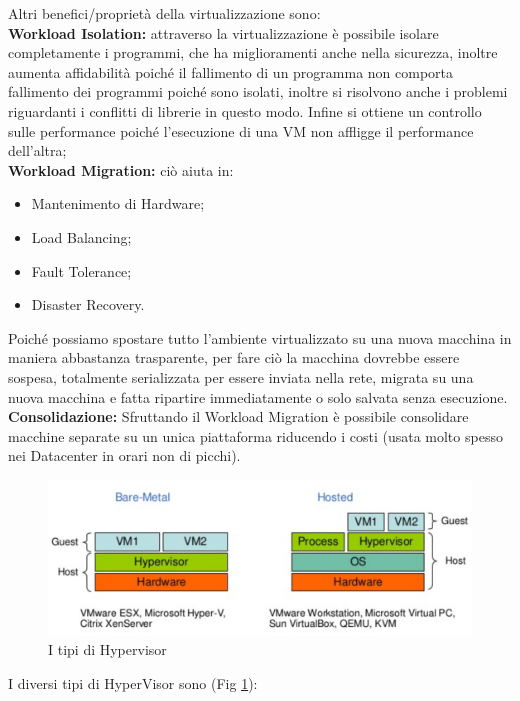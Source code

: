 \documentclass[11pt, twocolumn]{article}
\newenvironment{myitemize}
{ \begin{itemize}
		\setlength{\itemsep}{0pt}
		\setlength{\parskip}{0pt}
		\setlength{\parsep}{0pt}     }
	{ \end{itemize}                  }
\begin{document}
Altri benefici/proprietà della virtualizzazione sono:\\
\textbf{Workload Isolation:} attraverso la virtualizzazione è possibile isolare completamente i programmi, che ha miglioramenti anche nella sicurezza, inoltre aumenta affidabilità poiché il fallimento di un programma non comporta fallimento dei programmi poiché sono isolati, inoltre si risolvono anche i problemi riguardanti i conflitti di librerie in questo modo. Infine si ottiene un controllo sulle performance poiché l'esecuzione di una VM non affligge il performance dell'altra;\\
\textbf{Workload Migration:} ciò aiuta in:
\begin{myitemize}
	\item Mantenimento di Hardware;
	\item Load Balancing;
	\item Fault Tolerance;
	\item Disaster Recovery.
\end{myitemize}
Poiché possiamo spostare tutto l'ambiente virtualizzato su una nuova macchina in maniera abbastanza trasparente, per fare ciò la macchina dovrebbe essere sospesa, totalmente serializzata per essere inviata nella rete, migrata su una nuova macchina e fatta ripartire immediatamente o solo salvata senza esecuzione.\\
\textbf{Consolidazione:} Sfruttando il Workload Migration è possibile consolidare macchine separate su un unica piattaforma riducendo i costi (usata molto spesso nei Datacenter in orari non di picchi).\\
\begin{figure}[h]
	\centering
	\includegraphics[width=\linewidth]{imgs/hypervisor_type.png}
	\caption{I tipi di Hypervisor}
	\label{fig:hypervisor_type}
\end{figure}
I diversi tipi di HyperVisor sono (Fig \ref{fig:hypervisor_type}):
\end{document}
